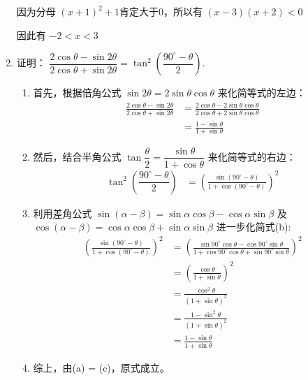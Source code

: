 \documentclass[answers]{exam}
\begin{document}
\begin{questions}
\begin{enumerate}[label=(\arabic*)]
\begin{solution}
			      因为分母 \( (x+1)^2 + 1  \)肯定大于0，所以有 \( (x-3)(x+2) < 0 \)

			      因此有 \( -2 < x < 3 \)
		      \end{solution}

		\item 证明： \( \dfrac{2\cos\theta - \sin2\theta}{2\cos\theta + \sin2\theta} = \tan^2\left(\dfrac{90^\circ -
			      \theta}{2}\right) \).
		      \begin{solution}
			      \begin{enumerate}[label=\arabic*. ]
				      \item 首先，根据倍角公式 \( \sin2\theta = 2\sin\theta\cos\theta \) 来化简等式的左边：
				            \begin{align*}
					            \frac{2\cos\theta - \sin2\theta}{2\cos\theta + \sin2\theta}
					             & = \frac{2\cos\theta - 2\sin\theta\cos\theta}{2\cos\theta + 2\sin\theta\cos\theta} \\
					             & = \frac{1-\sin\theta}{1+\sin\theta} \tag{a}
				            \end{align*}
				      \item 然后，结合半角公式 \( \tan\dfrac{\theta}{2} = \dfrac{\sin\theta}{1+\cos\theta} \)
				            来化简等式的右边：
				            \begin{align*}
					            \tan^2\left(\dfrac{90^\circ - \theta}{2}\right)
					             & = \left(\frac{\sin(90^\circ-\theta)}{1+\cos(90^\circ-\theta)}\right)^2 \tag{b}
				            \end{align*}
				      \item 利用差角公式 \( \sin(\alpha-\beta) = \sin\alpha\cos\beta - \cos\alpha\sin\beta \) 及 \(
				            \cos(\alpha - \beta) = \cos\alpha\cos\beta + \sin\alpha\sin\beta \) 进一步化简式(b):
				            \begin{align*}
					            \left(\frac{\sin(90^\circ-\theta)}{1+\cos(90^\circ-\theta)}\right)^2
					             & = \left(\frac{\sin90^\circ\cos\theta -
						            \cos90^\circ\sin\theta}{1+\cos90^\circ\cos\theta + \sin90^\circ\sin\theta}\right)^2
					            \\
					             & = \left(\frac{\cos\theta}{1+\sin\theta}\right)^2 \\
					             & = \frac{\cos^2\theta}{(1+\sin\theta)^2}          \\
					             & = \frac{1-\sin^2\theta}{(1+\sin\theta)^2}        \\
					             & = \frac{1-\sin\theta}{1+\sin\theta} \tag{c}
				            \end{align*}
				      \item 综上，由(a) = (c)，原式成立。
			      \end{enumerate}
		      \end{solution}
	\end{enumerate}

\end{questions}
\end{document}
